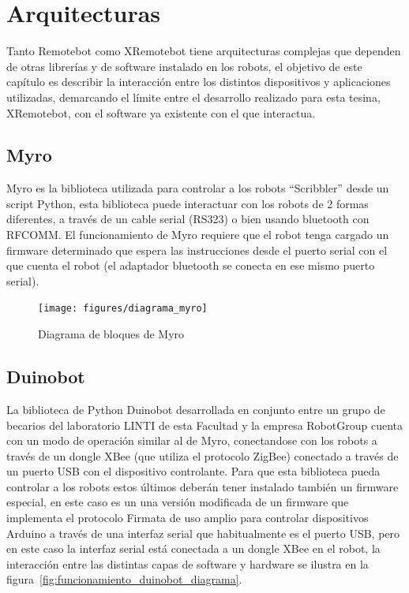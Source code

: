 \chapter{Arquitecturas}


Tanto Remotebot como XRemotebot tiene arquitecturas complejas que
dependen de otras librerías y de software instalado en los robots,
el objetivo de este capítulo es describir la interacción entre los
distintos dispositivos y aplicaciones utilizadas, demarcando el límite
entre el desarrollo realizado para esta tesina, XRemotebot, con el software ya
existente con el que interactua.

\section{Myro}\label{ch2:myro}

Myro es la biblioteca utilizada para controlar a los robots ``Scribbler''
desde un script Python, esta biblioteca puede interactuar con los robots de 2
formas diferentes, a través de un cable serial (RS323) o bien usando bluetooth
con RFCOMM. El funcionamiento de Myro requiere que el robot tenga
cargado un firmware determinado que espera las instrucciones desde el puerto
serial con el que cuenta el robot (el adaptador bluetooth se conecta en ese
mismo puerto serial).

\begin{figure}
    \centering
    \texttt{[image: figures/diagrama\_myro]}
    \caption{Diagrama de bloques de Myro}
    \label{fig:diagrama_myro}
\end{figure}

\section{Duinobot}\label{ch2:duinobot}

La biblioteca de Python Duinobot desarrollada en conjunto entre un grupo
de becarios del laboratorio LINTI de esta Facultad y la empresa RobotGroup
cuenta con un modo de operación similar al de Myro, conectandose con
los robots a través de un dongle XBee (que utiliza el protocolo ZigBee)
conectado a través de un puerto USB con el dispositivo controlante.
Para que esta biblioteca pueda controlar a los robots estos últimos
deberán tener instalado también un firmware especial, en este caso
es un una versión modificada de un firmware que implementa el protocolo
Firmata de uso amplio para controlar dispositivos Arduino a través de una
interfaz serial que habitualmente es el puerto USB, pero en este caso
la interfaz serial está conectada a un dongle XBee en el robot, la interacción
entre las distintas capas de software y hardware se ilustra en la
figura~\ref{fig:funcionamiento_duinobot_diagrama}.

